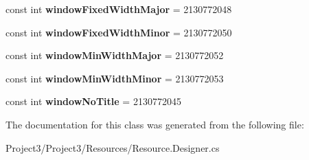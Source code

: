 \begin{DoxyCompactItemize}
const int {\bfseries window\+Fixed\+Width\+Major} = 2130772048
\item 
\mbox{\label{classXaria_1_1Resource_1_1Attribute_a3c5e6c3910df29b590e682fe755f1bc4}} 
const int {\bfseries window\+Fixed\+Width\+Minor} = 2130772050
\item 
\mbox{\label{classXaria_1_1Resource_1_1Attribute_a983e3ed1fd28b78865538365c5b58e90}} 
const int {\bfseries window\+Min\+Width\+Major} = 2130772052
\item 
\mbox{\label{classXaria_1_1Resource_1_1Attribute_a63a8d142154b7b677ae2f58705ab8f7b}} 
const int {\bfseries window\+Min\+Width\+Minor} = 2130772053
\item 
\mbox{\label{classXaria_1_1Resource_1_1Attribute_a4f122675e24f68e021acd7ad94d6da2b}} 
const int {\bfseries window\+No\+Title} = 2130772045
\end{DoxyCompactItemize}


The documentation for this class was generated from the following file\+:\begin{DoxyCompactItemize}
\item 
Project3/\+Project3/\+Resources/Resource.\+Designer.\+cs\end{DoxyCompactItemize}
